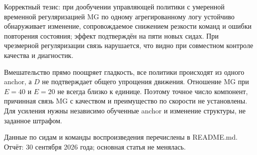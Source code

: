 \documentclass[10pt,a4paper]{article}
\begin{document}
Корректный тезис: при дообучении управляющей политики с умеренной временной регуляризацией MG по одному агрегированному логу устойчиво обнаруживает изменение, сопровождаемое снижением резкости команд и ошибки повторения состояния; эффект подтверждён на пяти новых сидах. При чрезмерной регуляризации связь нарушается, что видно при совместном контроле качества и диагностик.

Вмешательство прямо поощряет гладкость, все политики происходят из одного anchor, а $D$ не подтверждает общего упрощения движения. Отношение MG при $E=40$ и $E=20$ не всегда близко к единице. Поэтому точное число компонент, причинная связь MG с качеством и преимущество по скорости не установлены. Для усиления нужны независимо обученные anchor и изменение структуры, не заданное штрафом.

Данные по сидам и команды воспроизведения перечислены в README.md. Отчёт: 30 сентября 2026 года; основная статья не менялась.
\end{document}
